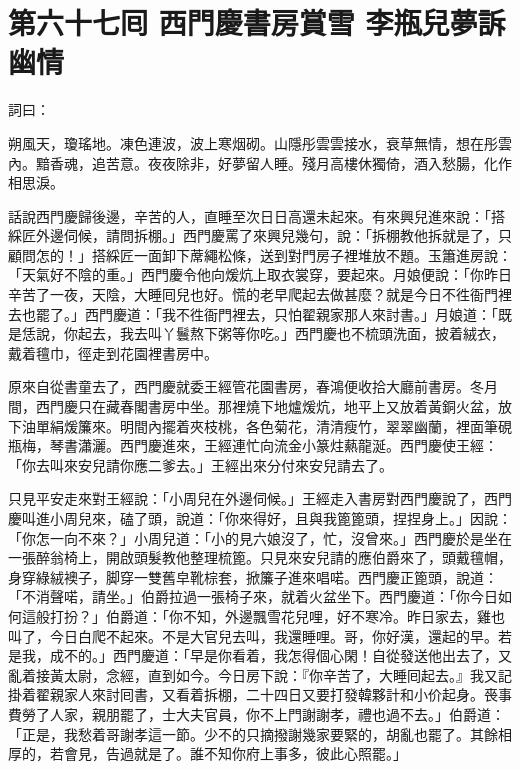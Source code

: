 
\chapter*{第六十七囘 西門慶書房賞雪 李瓶兒夢訴幽情}


詞曰：

\begin{myquote} 
朔風天，瓊瑤地。凍色連波，波上寒烟砌。山隱彤雲雲接水，衰草無情，想在彤雲內。黯香魂，追苦意。夜夜除非，好夢留人睡。殘月高樓休獨倚，酒入愁腸，化作相思淚。

\end{myquote} 

話說西門慶歸後邊，辛苦的人，直睡至次日日高還未起來。有來興兒進來說：「搭綵匠外邊伺候，請問拆棚。」西門慶罵了來興兒幾句，說：「拆棚教他拆就是了，只顧問怎的！」{}搭綵匠一面卸下蓆繩松條，送到對門房子裡堆放不題。玉簫進房說：「天氣好不陰的重。」西門慶令他向煖炕上取衣裳穿，要起來。月娘便說：「你昨日辛苦了一夜，天陰，大睡囘兒也好。慌的老早爬起去做甚麼？就是今日不徃衙門裡去也罷了。」西門慶道：「我不徃衙門裡去，只怕翟親家那人來討書。」月娘道：「既是恁說，你起去，我去叫丫鬟熬下粥等你吃。」西門慶也不梳頭洗面，披着絨衣，戴着氊巾，徑走到花園裡書房中。

原來自從書童去了，西門慶就委王經管花園書房，春鴻便收拾大廳前書房。冬月間，西門慶只在藏春閣書房中坐。那裡燒下地爐煖炕，地平上又放着黃銅火盆，放下油單絹煖簾來。明間內擺着夾枝桃，各色菊花，清清瘦竹，翠翠幽蘭，裡面筆硯瓶梅，琴書瀟灑。西門慶進來，王經連忙向流金小篆炷爇龍涎。西門慶使王經：「你去叫來安兒請你應二爹去。」王經出來分付來安兒請去了。

只見平安走來對王經說：「小周兒在外邊伺候。」王經走入書房對西門慶說了，西門慶叫進小周兒來，磕了頭，說道：「你來得好，且與我篦篦頭，捏捏身上。」因說：「你怎一向不來？」小周兒道：「小的見六娘沒了，忙，沒曾來。」西門慶於是坐在一張醉翁椅上，開啟頭髮教他整理梳篦。只見來安兒請的應伯爵來了，頭戴氊帽，身穿綠絨襖子，脚穿一雙舊皁靴棕套，掀簾子進來唱喏。西門慶正篦頭，說道：「不消聲喏，請坐。」伯爵拉過一張椅子來，就着火盆坐下。西門慶道：「你今日如何這般打扮？」伯爵道：「你不知，外邊飄雪花兒哩，好不寒冷。昨日家去，雞也叫了，今日白爬不起來。不是大官兒去叫，我還睡哩。哥，你好漢，還起的早。若是我，成不的。」{}西門慶道：「早是你看着，我怎得個心閑！自從發送他出去了，又亂着接黃太尉，念經，直到如今。今日房下說：『你辛苦了，大睡囘起去。』我又記掛着翟親家人來討囘書，又看着拆棚，二十四日又要打發韓夥計和小价起身。䘮事費勞了人家，親朋罷了，士大夫官員，你不上門謝謝孝，禮也過不去。」伯爵道：「正是，我愁着哥謝孝這一節。少不的只摘撥謝幾家要緊的，胡亂也罷了。其餘相厚的，若會見，告過就是了。誰不知你府上事多，彼此心照罷。」


